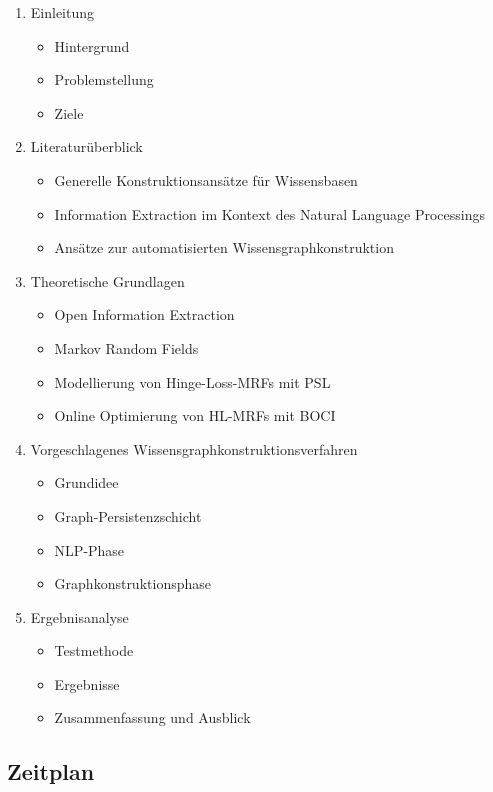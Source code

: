 \documentclass[11pt, a4paper]{scrreprt}
\begin{document}
\begin{enumerate}
	\item Einleitung
		\begin{itemize}
			\item Hintergrund
			\item Problemstellung
			\item Ziele
		\end{itemize}
	\item Literaturüberblick
		\begin{itemize}
			\item Generelle Konstruktionsansätze für Wissensbasen
			\item Information Extraction im Kontext des Natural Language Processings
			\item Ansätze zur automatisierten Wissensgraphkonstruktion
		\end{itemize}
	\item Theoretische Grundlagen
		\begin{itemize}
			\item Open Information Extraction
			\item Markov Random Fields
			\item Modellierung von Hinge-Loss-MRFs mit PSL
			\item Online Optimierung von HL-MRFs mit BOCI
		\end{itemize}
	\item Vorgeschlagenes Wissensgraphkonstruktionsverfahren
		\begin{itemize}
			\item Grundidee
			\item Graph-Persistenzschicht
			\item NLP-Phase
			\item Graphkonstruktionsphase
		\end{itemize}
	\item Ergebnisanalyse
		\begin{itemize}
			\item Testmethode
			\item Ergebnisse
			\item Zusammenfassung und Ausblick
		\end{itemize}
\end{enumerate}

\subsection{Zeitplan}
\end{document}
